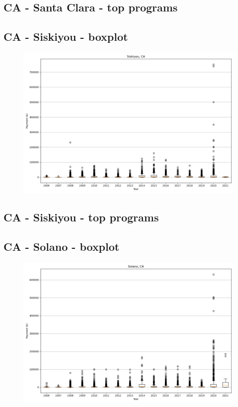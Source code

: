 \subsection*{CA - Santa Clara - top programs}

\newpage
\subsection*{CA - Siskiyou - boxplot}
\begin{figure}[h]
\centering
\includegraphics[width=7in]{../output/boxplots/counties/Siskiyou-CA_boxplot.png}
\end{figure}


\subsection*{CA - Siskiyou - top programs}

\newpage
\subsection*{CA - Solano - boxplot}
\begin{figure}[h]
\centering
\includegraphics[width=7in]{../output/boxplots/counties/Solano-CA_boxplot.png}
\end{figure}


